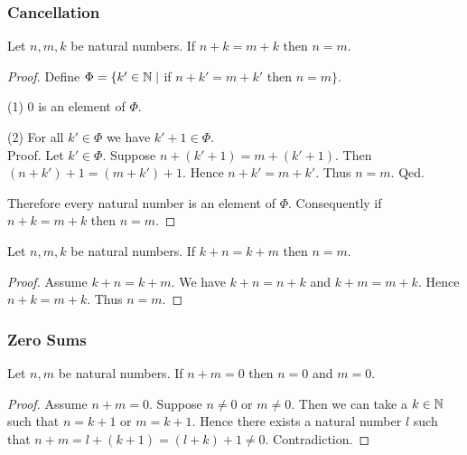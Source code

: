\documentclass[10pt]{article}
\begin{document}
  \subsubsection*{Cancellation}

  \begin{forthel}
    \begin{proposition}[id=ARITHMETIC_03_3137702874578944,printid]
      Let $n, m, k$ be natural numbers.
      If $n + k = m + k$ then $n = m$.
    \end{proposition}
    \begin{proof}
      Define $\Phi = \{ k' \in \mathbb{N} \mid$ if $n + k' = m + k'$ then $n = m \}$.

      (1) $0$ is an element of $\Phi$.

      (2) For all $k' \in \Phi$ we have $k' + 1 \in \Phi$. \\
      Proof.
        Let $k' \in \Phi$.
        Suppose $n + (k' + 1) = m + (k' + 1)$.
        Then $(n + k') + 1 = (m + k') + 1$.
        Hence $n + k' = m + k'$.
        Thus $n = m$.
      Qed.

      Therefore every natural number is an element of $\Phi$.
      Consequently if $n + k = m + k$ then $n = m$.
    \end{proof}
  \end{forthel}

  \begin{forthel}
    \begin{corollary}[id=ARITHMETIC_03_8445946379632640,printid]
      Let $n, m, k$ be natural numbers.
      If $k + n = k + m$ then $n = m$.
    \end{corollary}
    \begin{proof}
      Assume $k + n = k + m$.
      We have $k + n = n + k$ and $k + m = m + k$.
      Hence $n + k = m + k$.
      Thus $n = m$.
    \end{proof}
  \end{forthel}


  \subsubsection*{Zero Sums}

  \begin{forthel}
    \begin{proposition}[id=ARITHMETIC_03_3520602170195968,printid]
      Let $n, m$ be natural numbers.
      If $n + m = 0$ then $n = 0$ and $m = 0$.
    \end{proposition}
    \begin{proof}
      Assume $n + m = 0$.
      Suppose $n \neq 0$ or $m \neq 0$.
      Then we can take a $k \in \mathbb{N}$ such that $n = k + 1$ or $m = k + 1$.
      Hence there exists a natural number $l$ such that
      $n + m
        = l + (k + 1)
        = (l + k) + 1
        \neq 0$.
      Contradiction.
    \end{proof}
  \end{forthel}
\end{document}
